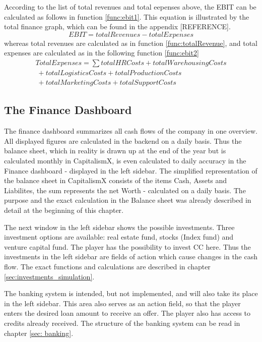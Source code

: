 According to the list of total revenues and total eepenses above, the EBIT can be calculated as follows in function \ref{func:ebit1}. This equation is illustrated by the total finance graph, which can be found in the appendix [REFERENCE]. 
\begin{equation}
\label{func:ebit1}
    EBIT = totalRevenues - totalExpenses
\end{equation}
whereas total revenues are calculated as in function \ref{func:totalRevenue}, and total expenses are calculated as in the following function \ref{func:ebit2}
\begin{equation}
    \label{func:ebit2}
    \begin{split}
       TotalExpenses = \sum totalHRCosts + totalWarehousingCosts \\\ +  totalLogisticsCosts + totalProductionCosts \\\ + totalMarketingCosts + totalSupportCosts 
    \end{split}
\end{equation}


\subsection{The Finance Dashboard}
The finance dashboard summarizes all cash flows of the company in one overview. All displayed figures are calculated in the backend on a daily basis. Thus the balance sheet, which in reality is drawn up at the end of the year but is calculated monthly in CapitalismX, is even calculated to daily accuracy in the Finance dashboard - displayed in the left sidebar. The simplified representation of the balance sheet in CapitalismX consists of the items Cash, Assets and Liabilites, the sum represents the net Worth - calculated on a daily basis. The purpose and the exact calculation in the Balance sheet was already described in detail at the beginning of this chapter. 

The next window in the left sidebar shows the possible investments. Three investment options are available: real estate fund, stocks (Index fund) and venture capital fund. The player has the possibility to invest CC here. Thus the investments in the left sidebar are fields of action which cause changes in the cash flow. The exact functions and calculations are described in chapter \ref{sec:investments_simulation}. 

The banking system is intended, but not implemented, and will also take its place in the left sidebar. This area also serves as an action field, so that the player enters the desired loan amount to receive an offer. The player also has access to credits already received. The structure of the banking system can be read in chapter \ref{sec: banking}. 

